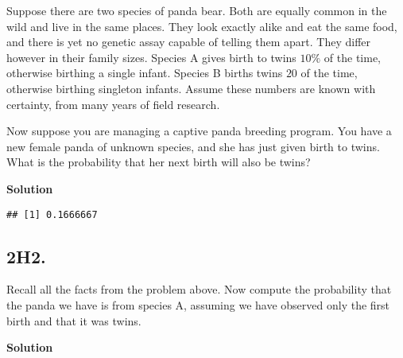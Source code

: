 \documentclass[
]{book}
\newenvironment{Shaded}{\begin{snugshade}}{\end{snugshade}}
\newcommand{\CommentTok}[1]{\textcolor[rgb]{0.56,0.35,0.01}{\textit{#1}}}
\newcommand{\DecValTok}[1]{\textcolor[rgb]{0.00,0.00,0.81}{#1}}
\newcommand{\FloatTok}[1]{\textcolor[rgb]{0.00,0.00,0.81}{#1}}
\newcommand{\KeywordTok}[1]{\textcolor[rgb]{0.13,0.29,0.53}{\textbf{#1}}}
\newcommand{\NormalTok}[1]{#1}
\newcommand{\OperatorTok}[1]{\textcolor[rgb]{0.81,0.36,0.00}{\textbf{#1}}}
\newcommand{\StringTok}[1]{\textcolor[rgb]{0.31,0.60,0.02}{#1}}
\begin{document}
Suppose there are two species of panda bear. Both are equally common in the wild and live in the same places. They look exactly alike and eat the same food, and there is yet no genetic assay capable of telling them apart. They differ however in their family sizes. Species A gives birth to twins \(10\%\) of the time, otherwise birthing a single infant. Species B births twins \(20%
\) of the time, otherwise birthing singleton infants. Assume these numbers are known with certainty, from many years of field research.

Now suppose you are managing a captive panda breeding program. You have a new female panda of unknown species, and she has just given birth to twins. What is the probability that her next birth will also be twins?

\textbf{Solution}

\begin{Shaded}
\end{Shaded}

\begin{verbatim}
## [1] 0.1666667
\end{verbatim}

\hypertarget{h2.}{%
\subsection{2H2.}\label{h2.}}

Recall all the facts from the problem above. Now compute the probability that the panda we have is from species A, assuming we have observed only the first birth and that it was twins.

\textbf{Solution}
\end{document}
